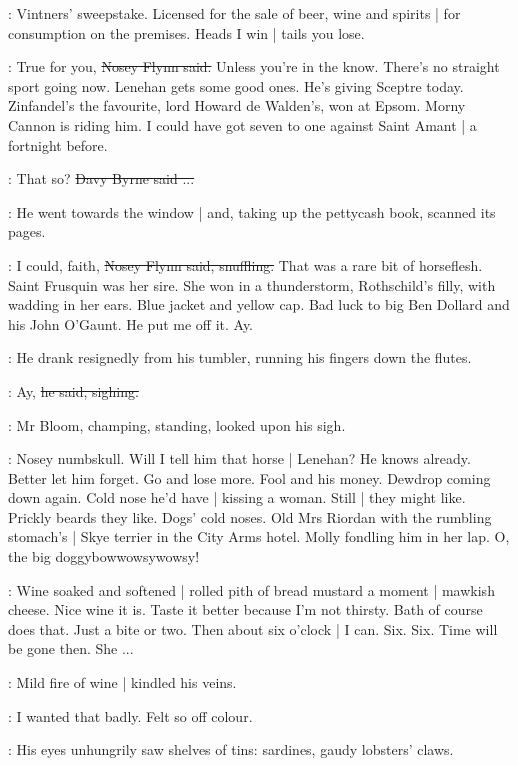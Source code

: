 \BloomInt:
Vintners' sweepstake.
Licensed for the sale of beer, wine and spirits |
for consumption on the premises.
Heads I win |
tails you lose.

\nosey:
True for you,
\sout{Nosey Flynn said.}
Unless you're in the know.
There's no straight sport going now.
Lenehan gets some good ones.
He's giving Sceptre today.
Zinfandel's the favourite,
lord Howard de Walden's,
won at Epsom.
Morny Cannon is riding him.
I could have got seven to one against Saint Amant |
a fortnight before.

\davybyrne:
That so?
\sout{Davy Byrne said ...}

:
He went towards the window |
and, taking up the pettycash book,
scanned its pages.

\nosey:
I could, faith,
\sout{Nosey Flynn said, snuffling.}
That was a rare bit of horseflesh.
Saint Frusquin was her sire.
She won in a thunderstorm,
Rothschild's filly,
with wadding in her ears.
Blue jacket and yellow cap.
Bad luck to big Ben Dollard and his John O'Gaunt.
He put me off it.
Ay.

:
He drank resignedly from his tumbler,
running his fingers down the flutes.

\nosey:
Ay,
\sout{he said, sighing.}

:
Mr Bloom,
champing, standing,
looked upon his sigh.

\BloomInt:
Nosey numbskull.
Will I tell him that horse |
Lenehan?
He knows already.
Better let him forget.
Go and lose more.
Fool and his money.
Dewdrop coming down again.
Cold nose he'd have |
kissing a woman.
Still |
they might like.
Prickly beards they like.
Dogs' cold noses.
Old Mrs Riordan with the rumbling stomach's |
Skye terrier in the City Arms hotel.
Molly fondling him in her lap.
O, the big doggybowwowsywowsy!

\BloomInt:
Wine soaked and softened |
rolled pith of bread
mustard a moment |
mawkish cheese.
Nice wine it is.
Taste it better because I'm not thirsty.
Bath of course does that.
Just a bite or two.
Then about six o'clock |
I can.
Six.
Six.
Time will be gone then.
She ...

:
Mild fire of wine |
kindled his veins.

\BloomInt:
I wanted that badly.
Felt so off colour.

:
His eyes unhungrily saw shelves of tins:
sardines, gaudy lobsters' claws.

